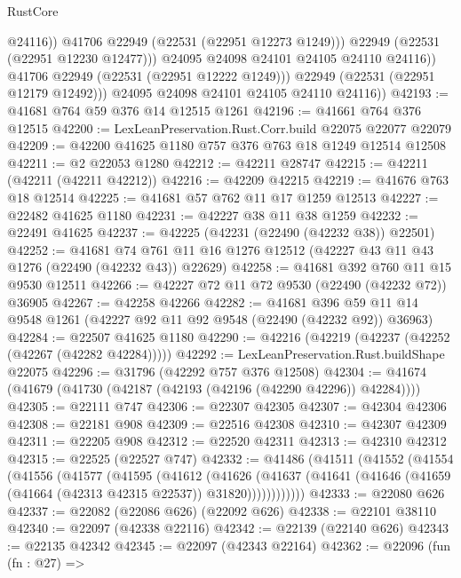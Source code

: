 \begin{lexlean}{RustCore}
\begin{coremodule}
                        @24116))
                    @41706
                    @22949
                    (@22531 (@22951 @12273 @1249)))
                  @22949
                  (@22531 (@22951 @12230 @12477)))
                @24095
                @24098
                @24101
                @24105
                @24110
                @24116))
            @41706
            @22949
            (@22531 (@22951 @12222 @1249)))
          @22949
          (@22531 (@22951 @12179 @12492)))
        @24095
        @24098
        @24101
        @24105
        @24110
        @24116))
@42193 := @41681 @764 @59 @376 @14 @12515 @1261
@42196 := @41661 @764 @376 @12515
@42200 := LexLeanPreservation.Rust.Corr.build @22075 @22077 @22079
@42209 := @42200 @41625 @1180 @757 @376 @763 @18 @1249 @12514 @12508
@42211 := @2 @22053 @1280
@42212 := @42211 @28747
@42215 := @42211 (@42211 (@42211 @42212))
@42216 := @42209 @42215
@42219 := @41676 @763 @18 @12514
@42225 := @41681 @57 @762 @11 @17 @1259 @12513
@42227 := @22482 @41625 @1180
@42231 := @42227 @38 @11 @38 @1259
@42232 := @22491 @41625
@42237 := @42225 (@42231 (@22490 (@42232 @38)) @22501)
@42252 := @41681
    @74
    @761
    @11
    @16
    @1276
    @12512
    (@42227 @43 @11 @43 @1276 (@22490 (@42232 @43)) @22629)
@42258 := @41681 @392 @760 @11 @15 @9530 @12511
@42266 := @42227 @72 @11 @72 @9530 (@22490 (@42232 @72)) @36905
@42267 := @42258 @42266
@42282 := @41681
    @396
    @59
    @11
    @14
    @9548
    @1261
    (@42227 @92 @11 @92 @9548 (@22490 (@42232 @92)) @36963)
@42284 := @22507 @41625 @1180
@42290 := @42216 (@42219 (@42237 (@42252 (@42267 (@42282 @42284)))))
@42292 := LexLeanPreservation.Rust.buildShape @22075
@42296 := @31796 (@42292 @757 @376 @12508)
@42304 := @41674 (@41679 (@41730 (@42187 (@42193 (@42196 (@42290 @42296)) @42284))))
@42305 := @22111 @747
@42306 := @22307 @42305
@42307 := @42304 @42306
@42308 := @22181 @908
@42309 := @22516 @42308
@42310 := @42307 @42309
@42311 := @22205 @908
@42312 := @22520 @42311
@42313 := @42310 @42312
@42315 := @22525 (@22527 @747)
@42332 := @41486
    (@41511
      (@41552
        (@41554
          (@41556
            (@41577
              (@41595
                (@41612
                  (@41626
                    (@41637
                      (@41641 (@41646 (@41659 (@41664 (@42313 @42315 @22537)) @31820))))))))))))
@42333 := @22080 @626
@42337 := @22082 (@22086 @626) (@22092 @626)
@42338 := @22101 @38110
@42340 := @22097 (@42338 @22116)
@42342 := @22139 (@22140 @626)
@42343 := @22135 @42342
@42345 := @22097 (@42343 @22164)
@42362 := @22096
    (fun (fn : @27) =>

\end{coremodule}
\end{lexlean}
